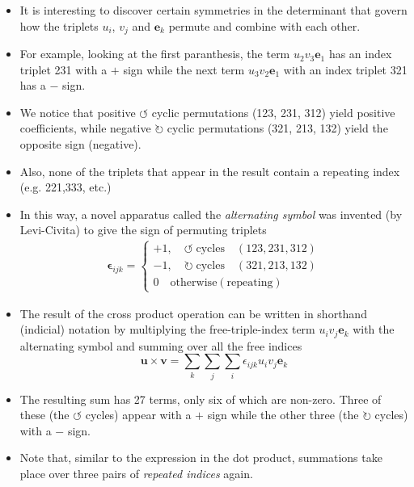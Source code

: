 \documentclass[11pt]{article}
\begin{document}
\begin{itemize}
\item It is interesting to discover certain symmetries in the determinant that govern how the triplets \(u_i\), \(v_j\) and \(\boldsymbol{e}_k\) permute and combine with each other.
\end{itemize}
\begin{itemize}
\item For example, looking at the first paranthesis, the term \(u_2 v_3 \boldsymbol{e}_1\) has an index triplet 231 with a \(+\) sign while the next term \(u_3 v_2 \boldsymbol{e}_1\) with an index triplet 321 has a \(-\) sign.
\item We notice that positive \(\circlearrowleft\) cyclic permutations (123, 231, 312) yield positive coefficients, while negative \(\circlearrowright\) cyclic permutations (321, 213, 132) yield the opposite sign (negative).
\item Also, none of the triplets that appear in the result contain a repeating index (e.g. 221,333, etc.)
\item In this way, a novel apparatus called the \emph{alternating symbol} was invented (by Levi-Civita) to give the sign of permuting triplets
\begin{align}
\boldsymbol{\epsilon}_{ijk} = \left\{ \begin{array}{c} +1, \quad \circlearrowleft\; \mathrm{cycles} \quad  (123, 231, 312) \\ -1, \quad \circlearrowright\; \mathrm{cycles} \quad  (321, 213, 132) \\ 0 \quad \mathrm{otherwise (repeating)} \end{array} \right.
\end{align}
\end{itemize}

\begin{itemize}
\item The result of the cross product operation can be written in shorthand (indicial) notation by multiplying the free-triple-index term \(u_i v_j \boldsymbol{e}_k\) with the alternating symbol and summing over all the free indices
$$ \boldsymbol{u} \times \boldsymbol{v} = \sum_k \sum_j \sum_i \epsilon_{ijk} u_i v_j \boldsymbol{e}_k $$
\end{itemize}
\begin{itemize}
\item The resulting sum has 27 terms, only six of which are non-zero. Three of these (the \(\circlearrowleft\) cycles) appear with a \(+\) sign while the other three (the \(\circlearrowright\) cycles)  with a \(-\) sign.
\item Note that, similar to the expression in the dot product, summations take place over three pairs of \emph{repeated indices} again.
\end{itemize}
\end{document}
